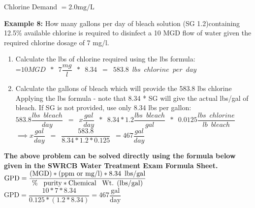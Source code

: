 \documentclass{article}
\begin{document}
Chlorine Demand $=2.0 \mathrm{mg} / \mathrm{L}$

\textbf{Example 8:} How many gallons per day of bleach solution (SG 1.2)containing 12.5\% available chlorine is required to disinfect a 10 MGD flow of water given the required chlorine dosage of 7 mg/l.\\
\begin{enumerate}
\item Calculate the lbs of chlorine required using the lbs formula:\\
\vspace{0.5cm}
=$10 MGD \enspace * \enspace 7 \dfrac{mg}{l} \enspace * \enspace 8.34\enspace=\enspace 583.8 \enspace lbs \enspace chlorine \enspace per \enspace day$\\
\vspace{0.5cm}
\item Calculate the gallons of bleach which will provide the 583.8 lbs chlorine\\
\vspace{0.5cm}
Applying the lbs formula - note that 8.34 * SG will give the actual lbs/gal of bleach.  If SG is not provided, use only 8.34 lbs per gallon:\\
\vspace{0.5cm}
$583.8 \dfrac{lbs \enspace bleach}{day}\enspace=\enspace x \dfrac{gal}{day} \enspace * \enspace 8.34 * 1.2 \dfrac{lbs \enspace bleach}{gal} \enspace * \enspace 0.0125 \dfrac{lbs \enspace chlorine}{lb \enspace bleach} \enspace $\\
\vspace{0.5cm}
$ \implies x \dfrac{gal}{day}\enspace = \enspace \dfrac{583.8}{8.34*1.2*0.125} \enspace = \boxed{467 \dfrac{gal}{day}}$
\end{enumerate}
\vspace{0.3cm}
\textbf{The above problem can be solved directly using the formula below given in the SWRCB Water Treatment Exam Formula Sheet.}\\
\vspace{0.3cm}
 $\textrm{GPD}=\dfrac{\textrm{(MGD)}*\textrm{(ppm or mg/l)}*8.34 \enspace \textrm{lbs/gal}}{\textrm{\% \enspace purity}*\textrm{Chemical \enspace Wt. (lbs/gal)}}$ 
 \vspace{0.3cm}
 $\textrm{GPD}=\dfrac{10*7*8.34}{0.125*(1.2*8.34)}=\boxed{467 \dfrac{\textrm{gal}}{\textrm{day}}}$ 

\end{document}
